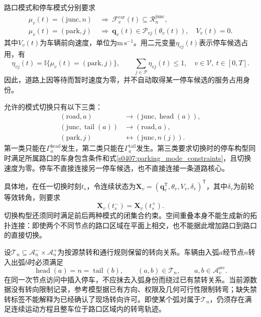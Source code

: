路口模式和停车模式分别要求
\begin{align}
 \mu_v(t)=(\mathrm{junc},n)
 &\ \Longrightarrow\ 
 \mathcal F_v^{\mathrm{car}}(t)
       \subseteq\mathcal R_n^{\mathrm{junc}},
 \label{s0407:junction_body_containment}\\
 \mu_v(t)=(\mathrm{park},j)
 &\ \Longrightarrow\ 
 \mathbf q_v(t)\in\mathcal P_{vj}(\theta_v(t)),\quad V_v(t)=0.
 \label{s0407:parking_mode_constraints}
\end{align}
其中$V_v(t)$为车辆前向速度，单位为$\mathrm{m\,s^{-1}}$。用二元变量$\eta_{vj}(t)$表示停车候选占用，有
\begin{equation}
 \eta_{vj}(t)=\mathbb I\{\mu_v(t)=(\mathrm{park},j)\},\qquad
 \sum_{j\in\mathcal P}\eta_{vj}(t)\le1,
 \quad v\in\mathcal V,\ t\in[0,T].
 \label{s0407:parking_indicator}
\end{equation}
因此，道路上因等待而暂时速度为零，并不自动取得某一停车候选的服务占用身份。

允许的模式切换只有以下三类：
\begin{equation}
 \begin{split}
 (\mathrm{road},a)&\longrightarrow
       (\mathrm{junc},\operatorname{head}(a)),\\
 (\mathrm{junc},\operatorname{tail}(a))&\longrightarrow
       (\mathrm{road},a),\\
 (\mathrm{park},j)&\longleftrightarrow
       (\mathrm{junc},n(j)).
 \end{split}
 \label{s0407:allowed_switches}
\end{equation}
第一类只能在$\Gamma_a^{\mathrm{head}}$发生，第二类只能在$\Gamma_a^{\mathrm{tail}}$发生。第三类要求切换时的停车构型同时满足所属路口的车身包含条件和式\eqref{s0407:parking_mode_constraints}，且切换速度为零。停车不直接连接另一停车候选，也不直接连接一条道路核心。

具体地，在任一切换时刻$t_s$，令连续状态为$\mathbf X_v=(\mathbf q_v^{\mathsf T},\theta_v,V_v,\delta_v)^{\mathsf T}$，其中$\delta_v$为前轮等效转角，则要求
\begin{equation}
 \mathbf X_v(t_s^-)=\mathbf X_v(t_s^+).
 \label{s0407:switch_continuity}
\end{equation}
切换构型还须同时满足前后两种模式的闭集合约束。空间重叠本身不能生成新的拓扑连接：即使两个不同节点的路口区域在平面上相交，也不能据此增加路口到路口的直接切换。

设$\mathcal T_n\subseteq\mathcal A_n^-\times\mathcal A_n^+$为按源禁转和通行规则保留的转向关系。车辆由入弧$a$经节点$n$转入出弧$b$时必须满足
\begin{equation}
 \operatorname{head}(a)=n=\operatorname{tail}(b),\qquad
 (a,b)\in\mathcal T_n,
 \qquad a,b\in\mathcal A_v^{\mathrm{src}}.
 \label{s0407:turn_permission}
\end{equation}
在同一次节点访问中插入停车，不应抹去入弧身份而绕过已有禁转关系。当前源数据没有转向限制记录，参考模型据已有方向、权限及几何可行性限制转弯；缺失禁转标签不能解释为已经确认了现场转向许可。即使某个弧对属于$\mathcal T_n$，仍须存在满足连续运动方程且整车位于路口区域内的转弯轨迹。

